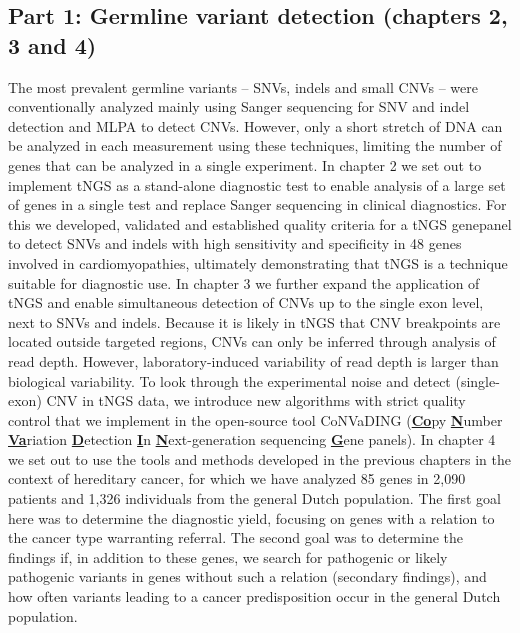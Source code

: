 \subsection[Germline variant detection]{Part 1:  Germline variant detection \newline (chapters 2, 3 and 4)}\label{Part 1}
The most prevalent germline variants – SNVs, indels and small CNVs – were conventionally analyzed mainly using Sanger sequencing for SNV and indel detection and MLPA to detect CNVs. 
However, only a short stretch of DNA can be analyzed in each measurement using these techniques, limiting the number of genes that can be analyzed in a single experiment. 
In chapter 2 we set out to implement tNGS as a stand-alone diagnostic test to enable analysis of a large set of genes in a single test and replace Sanger sequencing in clinical diagnostics. For this we developed, validated and established quality criteria for a tNGS genepanel to detect SNVs and indels with high sensitivity and specificity in 48 genes involved in cardiomyopathies, ultimately demonstrating that tNGS is a technique suitable for diagnostic use. 
In chapter 3 we further expand the application of tNGS and enable simultaneous detection of CNVs up to the single exon level, next to SNVs and indels. 
Because it is likely in tNGS that CNV breakpoints are located outside targeted regions, CNVs can only be inferred through analysis of read depth. 
However, laboratory-induced variability of read depth is larger than biological variability. 
To look through the experimental noise and detect (single-exon) CNV in tNGS data, we introduce new algorithms with strict quality control that we implement in the open-source tool CoNVaDING (\textbf{\underline{Co}}py \textbf{\underline{N}}umber \textbf{\underline{Va}}riation \textbf{\underline{D}}etection \textbf{\underline{I}}n \textbf{\underline{N}}ext-generation sequencing \textbf{\underline{G}}ene panels). 
In chapter 4 we set out to use the tools and methods developed in the previous chapters in the context of hereditary cancer, for which we have analyzed 85 genes in 2,090 patients and 1,326 individuals from the general Dutch population. 
The first goal here was to determine the diagnostic yield, focusing on genes with a relation to the cancer type warranting referral. 
The second goal was to determine the findings if, in addition to these genes, we search for pathogenic or likely pathogenic variants in genes without such a relation (secondary findings), and how often variants leading to a cancer predisposition occur in the general Dutch population. 

